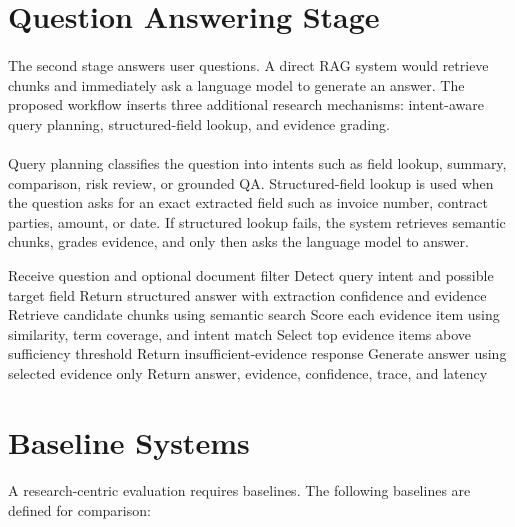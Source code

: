 \section{Question Answering Stage}
\paragraph{} The second stage answers user questions. A direct RAG system would retrieve chunks and immediately ask a language model to generate an answer. The proposed workflow inserts three additional research mechanisms: intent-aware query planning, structured-field lookup, and evidence grading.

\paragraph{} Query planning classifies the question into intents such as field lookup, summary, comparison, risk review, or grounded QA. Structured-field lookup is used when the question asks for an exact extracted field such as invoice number, contract parties, amount, or date. If structured lookup fails, the system retrieves semantic chunks, grades evidence, and only then asks the language model to answer.

\begin{algorithm}[h]
\caption{Evidence-Graded Agentic RAG}
\label{alg:agentic_rag}
\begin{algorithmic}[1]
\State Receive question and optional document filter
\State Detect query intent and possible target field
    \State Return structured answer with extraction confidence and evidence
\Else
    \State Retrieve candidate chunks using semantic search
    \State Score each evidence item using similarity, term coverage, and intent match
    \State Select top evidence items above sufficiency threshold
        \State Return insufficient-evidence response
    \Else
        \State Generate answer using selected evidence only
        \State Return answer, evidence, confidence, trace, and latency
    \EndIf
\EndIf
\end{algorithmic}
\end{algorithm}

\section{Baseline Systems}
\paragraph{} A research-centric evaluation requires baselines. The following baselines are defined for comparison:

